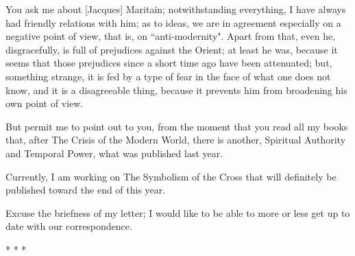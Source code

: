 You ask me about [Jacques] Maritain; notwithstanding everything, I have always had friendly relations with him; as to ideas, we are in agreement especially on a negative point of view, that is, on ``anti-modernity". Apart from that, even he, disgracefully, is full of prejudices against the Orient; at least he was, because it seems that those prejudices since a short time ago have been attenuated; but, something strange, it is fed by a type of fear in the face of what one does not know, and it is a disagreeable thing, because it prevents him from broadening his own point of view.

But permit me to point out to you, from the moment that you read all my books that, after The Crisis of the Modern World, there is another, Spiritual Authority and Temporal Power, what was published last year.

Currently, I am working on The Symbolism of the Cross that will definitely be published toward the end of this year.

Excuse the briefness of my letter; I would like to be able to more or less get up to date with our correspondence.




\begin{center}* * *\end{center}

